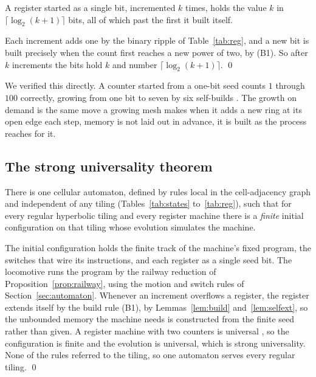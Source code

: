 \begin{lemma}
\label{lem:selfext}
A register started as a single bit, incremented $k$ times, holds the value $k$ in $\lceil \log_2(k+1) \rceil$
bits, all of which past the first it built itself.
\end{lemma}

Each increment adds one by the binary ripple of Table~\ref{tab:reg}, and a new bit is built precisely when the
count first reaches a new power of two, by (B1). So after $k$ increments the bits hold $k$ and number
$\lceil \log_2(k+1) \rceil$. \qed

We verified this directly. A counter started from a one-bit seed counts $1$ through $100$ correctly, growing
from one bit to seven by six self-builds \cite{pollard2026vibe}. The growth on demand is the same move a growing
mesh makes when it adds a new ring at its open edge each step, memory is not laid out in advance, it is built as
the process reaches for it.

\subsection{The strong universality theorem}

\begin{theorem}
\label{thm:strong}
There is one cellular automaton, defined by rules local in the cell-adjacency graph and independent of any
tiling (Tables~\ref{tab:states} to~\ref{tab:reg}), such that for every regular hyperbolic tiling and every
register machine there is a \textit{finite} initial configuration on that tiling whose evolution simulates the machine.
\end{theorem}

The initial configuration holds the finite track of the machine's fixed program, the switches that wire its
instructions, and each register as a single seed bit. The locomotive runs the program by the railway reduction
of Proposition~\ref{prop:railway}, using the motion and switch rules of Section~\ref{sec:automaton}. Whenever an
increment overflows a register, the register extends itself by the build rule (B1), by Lemmas~\ref{lem:build}
and~\ref{lem:selfext}, so the unbounded memory the machine needs is constructed from the finite seed rather than
given. A register machine with two counters is universal \cite{minsky1967}, so the configuration is finite and
the evolution is universal, which is strong universality. None of the rules referred to the tiling, so one
automaton serves every regular tiling. \qed

